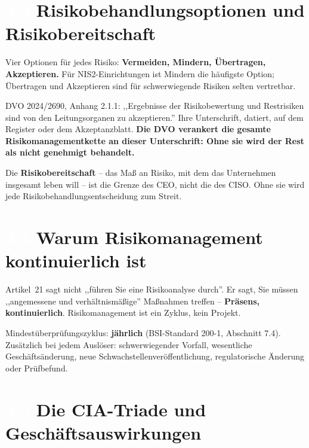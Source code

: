 \documentclass[11pt,a4paper,twoside]{book}
\newcommand{\lessontag}[1]{%
  \texorpdfstring{%
    \setlength{\fboxsep}{3pt}\colorbox{nisd2blue}{\textcolor{white}{\footnotesize\bfseries #1}}\quad%
  }{Lektion #1\ }%
}
\begin{document}
\section{\lessontag{2.3}Risikobehandlungsoptionen und Risikobereitschaft}

Vier Optionen für jedes Risiko: \textbf{Vermeiden, Mindern, Übertragen, Akzeptieren.} Für NIS2-Einrichtungen ist Mindern die häufigste Option; Übertragen und Akzeptieren sind für schwerwiegende Risiken selten vertretbar.

\begin{warningbox}
DVO 2024/2690, Anhang 2.1.1: ,,Ergebnisse der Risikobewertung und Restrisiken sind von den Leitungsorganen zu akzeptieren.'' Ihre Unterschrift, datiert, auf dem Register oder dem Akzeptanzblatt. \textbf{Die DVO verankert die gesamte Risikomanagementkette an dieser Unterschrift: Ohne sie wird der Rest als nicht genehmigt behandelt.}
\end{warningbox}

Die \textbf{Risikobereitschaft} -- das Maß an Risiko, mit dem das Unternehmen insgesamt leben will -- ist die Grenze des CEO, nicht die des CISO. Ohne sie wird jede Risikobehandlungsentscheidung zum Streit.

\section{\lessontag{2.4}Warum Risikomanagement kontinuierlich ist}

Artikel~21 sagt nicht ,,führen Sie eine Risikoanalyse durch''. Er sagt, Sie müssen ,,angemessene und verhältnismäßige'' Maßnahmen treffen -- \textbf{Präsens, kontinuierlich}. Risikomanagement ist ein Zyklus, kein Projekt.

Mindestüberprüfungszyklus: \textbf{jährlich} (BSI-Standard 200-1, Abschnitt 7.4). Zusätzlich bei jedem Auslöser: schwerwiegender Vorfall, wesentliche Geschäftsänderung, neue Schwachstellenveröffentlichung, regulatorische Änderung oder Prüfbefund.

\section{\lessontag{2.5}Die CIA-Triade und Geschäftsauswirkungen}
\end{document}
